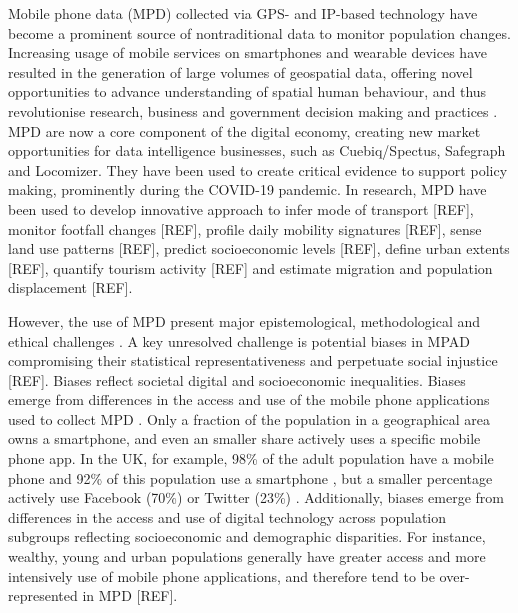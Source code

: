 \documentclass[]{rsos}%
\begin{document}
Mobile phone data (MPD) collected via GPS- and IP-based technology have
become a prominent source of nontraditional data to monitor population
changes. Increasing usage of mobile services on smartphones and wearable
devices have resulted in the generation of large volumes of geospatial
data, offering novel opportunities to advance understanding of spatial
human behaviour, and thus revolutionise research, business and
government decision making and practices \citep{rowe23-bigdata}. MPD are now
a core component of the digital economy, creating new market
opportunities for data intelligence businesses, such as Cuebiq/Spectus,
Safegraph and Locomizer. They have been used to create critical evidence
to support policy making, prominently during the COVID-19 pandemic. In
research, MPD have been used to develop innovative approach to infer
mode of transport {[}REF{]}, monitor footfall changes {[}REF{]}, profile daily
mobility signatures {[}REF{]}, sense land use patterns {[}REF{]}, predict
socioeconomic levels {[}REF{]}, define urban extents {[}REF{]}, quantify tourism
activity {[}REF{]} and estimate migration and population displacement {[}REF{]}.

However, the use of MPD present major epistemological, methodological
and ethical challenges \citep{rowe23-bigdata}. A key unresolved challenge is
potential biases in MPAD compromising their statistical
representativeness and perpetuate social injustice {[}REF{]}. Biases reflect
societal digital and socioeconomic inequalities. Biases emerge from
differences in the access and use of the mobile phone applications used
to collect MPD \citep{wesolowski13-biases}. Only a fraction of the population
in a geographical area owns a smartphone, and even an smaller share
actively uses a specific mobile phone app. In the UK, for example, 98\%
of the adult population have a mobile phone and 92\% of this population
use a smartphone \citep{ofcom23}, but a smaller percentage actively use
Facebook (70\%) or Twitter (23\%) \citep{statista24}. Additionally, biases
emerge from differences in the access and use of digital technology
across population subgroups reflecting socioeconomic and demographic
disparities. For instance, wealthy, young and urban populations
generally have greater access and more intensively use of mobile phone
applications, and therefore tend to be over-represented in MPD {[}REF{]}.
\end{document}
